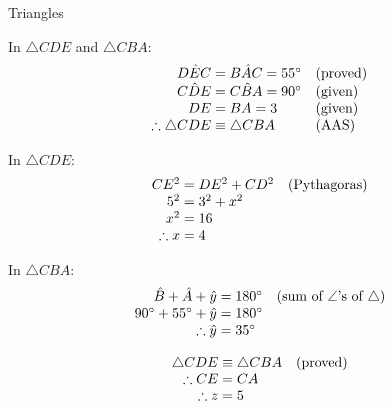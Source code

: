 \begin{wex}{Triangles}
{In $\triangle CDE$ and $\triangle CBA$:
\begin{equation*}
  \begin{array}{r@{\;}l@{\quad}l}
    D\hat{E}C &= B\hat{A}C = 55^{\circ} & \mbox{(proved)} \\
    C\hat{D}E &= C\hat{B}A = 90^{\circ} & \mbox{(given)} \\
           DE &= BA = 3                & \mbox{(given)} \\
    \therefore \triangle{CDE} &\equiv \triangle {CBA} & \mbox{(AAS)} 
  \end{array}
\end{equation*}

In $\triangle CDE$:
\begin{equation*}
  \begin{array}{r@{\;}l@{\quad}l}
    CE^{2} &= DE^{2} + CD^{2} & \mbox{(Pythagoras)} \\
    5^{2} &= 3^{2} + x^{2} &  \\
    x^{2} &= 16 & \\
    \therefore x &= 4 &
  \end{array}
\end{equation*}

In $\triangle CBA$:
\begin{equation*}
  \begin{array}{r@{\;}l@{\quad}l}
    \hat{B} + \hat{A} + \hat{y} &= 180^{\circ} & \mbox{(sum of $\angle$'s of $\triangle$)} \\
    90^{\circ} + 55^{\circ} + \hat{y} &= 180^{\circ} & \\
    \therefore \hat{y} &= 35^{\circ} &
  \end{array}
\end{equation*}

\begin{equation*}
  \begin{array}{r@{\;}l@{\quad}l}
    \triangle CDE &\equiv \triangle CBA & \mbox{(proved)} \\
    \therefore CE &= CA                 & \\
     \therefore z &= 5                  & 
  \end{array}
\end{equation*}
}
\end{wex}
% 
% 
%    
